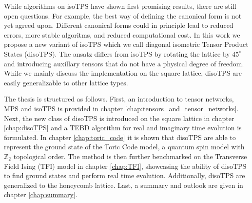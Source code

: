 While algorithms on isoTPS have shown first promising results, there are still open questions. For example, the best way of defining the canonical form is not yet agreed upon. Different canonical forms could in principle lead to reduced errors, more stable algoritms, and reduced computational cost. In this work we propose a new variant of isoTPS which we call diagonal isometric Tensor Product States (disoTPS). The ansatz differs from isoTPS by rotating the lattice by $45^\circ$ and introducing auxillary tensors that do not have a physical degree of freedom. While we mainly discuss the implementation on the square lattice, disoTPS are easily generalizable to other lattice types.
\par
The thesis is structured as follows. First, an introduction to tensor networks, MPS and isoTPS is provided in chapter \ref{chap:tensors_and_tensor_networks}. Next, the new class of disoTPS is introduced on the square lattice in chapter \ref{chap:disoTPS} and a TEBD algorithm for real and imaginary time evolution is formulated. In chapter \ref{chap:toric_code} it is shown that disoTPS are able to represent the ground state of the Toric Code model, a quantum spin model with $\mathbb{Z}_2$ topological order. The method is then further benchmarked on the Transverse Field Ising (TFI) model in chapter \ref{chap:TFI}, showcasing the ability of disoTPS to find ground states and perform real time evolution. Additionally, disoTPS are generalized to the honeycomb lattice. Last, a summary and outlook are given in chapter \ref{chap:summary}.